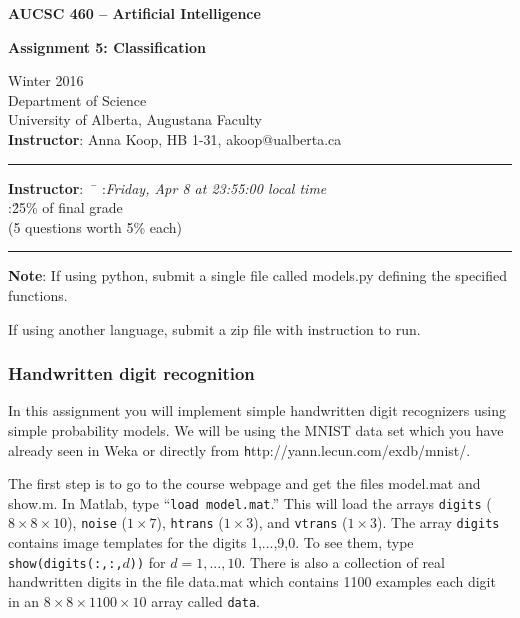 \documentclass[12pt]{article}
\begin{document}
\noindent
{\Large\bf AUCSC 460 -- Artificial Intelligence}

\vspace*{1\baselineskip}

\noindent
{\large\bf Assignment 5: Classification}

\vspace*{1\baselineskip}

\noindent
Winter 2016\\
Department of Science\\
University of Alberta, Augustana Faculty\\
{\bf Instructor}: Anna Koop, HB 1-31, akoop@ualberta.ca

\vspace*{1.75\baselineskip}
\hrule

\begin{tabbing}
{\bf Instructor}:\ \ \=\kill
{}:\'{\em Friday, Apr 8 at 23:55:00 local time}
\\
:\' 25\% of final grade \\
\>(5 questions worth 5\% each)
\end{tabbing}

\hrule

\vspace*{1.25\baselineskip}

\noindent
{\bf Note}:
If using python, submit a single file called models.py defining the specified functions.

If using another language, submit a zip file with instruction to run.

\subsubsection*{Handwritten digit recognition}

\noindent
In this assignment you will implement simple handwritten digit
recognizers using simple probability models.
We will be using the MNIST data set which you have already seen in Weka or directly from {\texttt http://yann.lecun.com/exdb/mnist/}.

The first step is to go to the course webpage 
and get the files model.mat and show.m.
In Matlab, type ``{\tt load model.mat}.''
This will load the arrays
{\tt digits} ($8\times8\times10$),
{\tt noise} ($1\times7$),
{\tt htrans} ($1\times3$),
and
{\tt vtrans} ($1\times3$).
The array {\tt digits} contains image templates for the digits
1,...,9,0.
To see them, type {\tt show(digits(:,:,}$d${\tt))} for $d=1,...,10$.
There is also a collection of real handwritten
digits in the file data.mat
which contains 1100 examples each digit in an $8\times8\times1100\times10$
array called {\tt data}.
\end{document}
